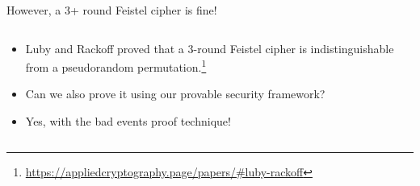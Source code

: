 \documentclass[aspectratio=169, lualatex, handout]{beamer}
\begin{document}
\begin{frame}{However, a 3+ round Feistel cipher is fine!}
	\begin{columns}[c]
		\begin{column}{0.4\textwidth}
			\begin{itemize}
				\item Luby and Rackoff proved that a 3-round Feistel cipher is indistinguishable from a pseudorandom permutation.\footnote{\url{https://appliedcryptography.page/papers/\#luby-rackoff}}
				\item Can we also prove it using our provable security framework?
				\item Yes, with the bad events proof technique!
			\end{itemize}
		\end{column}
		\begin{column}{0.6\textwidth}
			\begin{center}
			\end{center}
		\end{column}
	\end{columns}
\end{frame}
\end{document}
